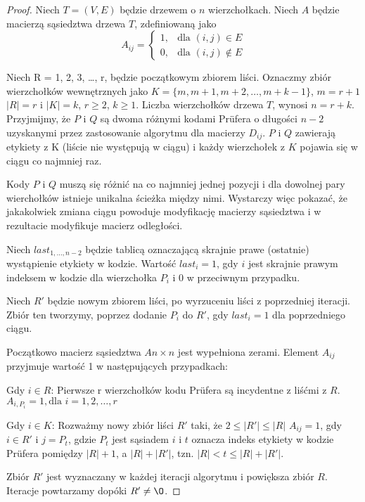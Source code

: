 \documentclass[a4paper,12p]{article}
\begin{document}
\begin{proof}
Niech $T = (V, E)$ będzie drzewem o $n$ wierzchołkach.
Niech $A$ będzie macierzą sąsiedztwa drzewa $T$, zdefiniowaną jako
\[
  A_{ij} = \left.
  \begin{cases}
    1, & \text{dla } (i, j) \in E \\
    0, & \text{dla } (i, j) \notin E
  \end{cases}
  \right.
\]

Niech R = {1, 2, 3, \dots, r}, będzie początkowym zbiorem liści. Oznaczmy zbiór wierzchołków wewnętrznych jako $K = \{m, m+1, m+2, \dots, m+k-1\}$, $m=r+1$ $|R| = r$ i $|K|=k$, $r \geq 2$, $k \geq 1$. Liczba wierzchołków drzewa $T$, wynosi $n = r + k$.
Przyjmijmy, że $P$ i $Q$ są dwoma różnymi kodami Prüfera o długości $n-2$ uzyskanymi przez zastosowanie algorytmu dla macierzy $D_{ij}$.
$P$ i $Q$ zawierają etykiety z K (liście nie występują w ciągu) i każdy wierzchołek z $K$ pojawia się w ciągu co najmniej raz.

Kody $P$ i $Q$ muszą się różnić na co najmniej jednej pozycji i dla dowolnej pary wierchołków istnieje unikalna ścieżka między nimi. Wystarczy więc pokazać, że jakakolwiek zmiana ciągu powoduje modyfikację macierzy sąsiedztwa i w rezultacie modyfikuje macierz odległości.

Niech $last_{1, \dots, n-2}$ będzie tablicą oznaczającą skrajnie prawe (ostatnie) wystąpienie etykiety w kodzie. Wartość $last_i = 1$, gdy $i$ jest skrajnie prawym indeksem w kodzie dla wierzchołka $P_i$ i 0 w przeciwnym przypadku.

Niech $R'$ będzie nowym zbiorem liści, po wyrzuceniu liści z poprzedniej iteracji. Zbiór ten tworzymy, poprzez dodanie $P_i$ do $R'$, gdy $last_i = 1$ dla poprzedniego ciągu.

Początkowo macierz sąsiedztwa $A{n \times n}$ jest wypełniona zerami. Element $A_{ij}$ przyjmuje wartość 1 w następujących przypadkach:

Gdy $i \in R$:
  Pierwsze r wierzchołków kodu Prüfera są incydentne z liśćmi z $R$.
  $A_{i, P_i} = 1, \text{dla } i = 1, 2, \dots, r$

Gdy $i \in K$:
  Rozważmy nowy zbiór liści $R'$ taki, że $2 \leq |R'| \leq |R|$ 
  $A_{ij} = 1$, gdy $ i \in R' $ i $j = P_t $, gdzie $P_t$ jest sąsiadem $i$ i $t$ oznacza indeks etykiety w kodzie Prüfera pomiędzy
   $|R| + 1$, a $|R| + |R'|$, tzn. $|R| < t \leq |R| + |R'|$.

Zbiór $R'$ jest wyznaczany w każdej iteracji algorytmu i powiększa zbiór $R$. Iteracje powtarzamy dopóki $R' \neq \O$.


\end{proof}
\end{document}
